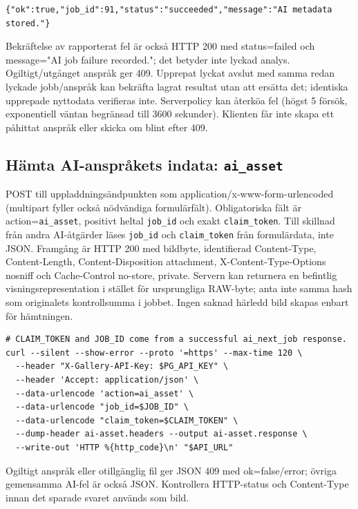 \documentclass[11pt,a4paper]{article}
\newcommand{\codeword}[1]{\nolinkurl{#1}}
\begin{document}
\begin{lstlisting}[language={}]
{"ok":true,"job_id":91,"status":"succeeded","message":"AI metadata stored."}
\end{lstlisting}

Bekräftelse av rapporterat fel är också HTTP 200 med status=failed och message="AI job
failure recorded."; det betyder inte lyckad analys. Ogiltigt/utgånget anspråk ger 409.
Upprepat lyckat avslut med samma redan lyckade jobb/anspråk kan bekräfta lagrat resultat
utan att ersätta det; identiska upprepade nyttodata verifieras inte. Serverpolicy kan
återköa fel (högst 5 försök, exponentiell väntan begränsad till 3600 sekunder). Klienten får
inte skapa ett påhittat anspråk eller skicka om blint efter 409.

\subsection{\texorpdfstring{Hämta AI-anspråkets indata: \codeword{ai_asset}}{Hämta AI-anspråkets indata: ai\_asset}}

\label{api352:ai-asset}

POST till uppladdningsändpunkten som application/x-www-form-urlencoded (multipart fyller
också nödvändiga formulärfält). Obligatoriska fält är action=\codeword{ai_asset}, positivt
heltal \codeword{job_id} och exakt \codeword{claim_token}. Till skillnad från andra
AI-åtgärder läses \codeword{job_id} och \codeword{claim_token} från formulärdata, inte JSON.
Framgång är HTTP 200 med bildbyte, identifierad Content-Type, Content-Length,
Content-Disposition attachment, X-Content-Type-Options nosniff och Cache-Control no-store,
private. Servern kan returnera en befintlig visningsrepresentation i stället för
ursprungliga RAW-byte; anta inte samma hash som originalets kontrollsumma i jobbet. Ingen
saknad härledd bild skapas enbart för hämtningen.

\begin{lstlisting}[language={}]
# CLAIM_TOKEN and JOB_ID come from a successful ai_next_job response.
curl --silent --show-error --proto '=https' --max-time 120 \
  --header "X-Gallery-API-Key: $PG_API_KEY" \
  --header 'Accept: application/json' \
  --data-urlencode 'action=ai_asset' \
  --data-urlencode "job_id=$JOB_ID" \
  --data-urlencode "claim_token=$CLAIM_TOKEN" \
  --dump-header ai-asset.headers --output ai-asset.response \
  --write-out 'HTTP %{http_code}\n' "$API_URL"
\end{lstlisting}

Ogiltigt anspråk eller otillgänglig fil ger JSON 409 med ok=false/error; övriga gemensamma
AI-fel är också JSON. Kontrollera HTTP-status och Content-Type innan det sparade svaret
används som bild.
\end{document}

